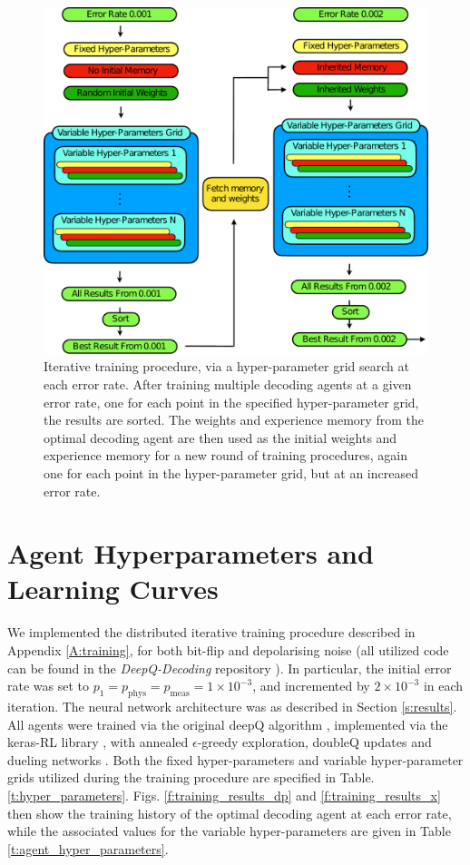 \documentclass[twocolumn,preprintnumbers,amsmath,amssymb,notitlepage,nofootinbib,longbibliography,superscriptaddress,aps,pra,10pt]{revtex4-1}
\begin{document}
	\begin{figure}
		\centering
		\includegraphics[width=\linewidth]{figures/iterative_training.pdf}
		\caption{Iterative training procedure, via a hyper-parameter grid search at each error rate. After training multiple decoding agents at a given error rate, one for each point in the specified hyper-parameter grid, the results are sorted. The weights and experience memory from the optimal decoding agent are then used as the initial weights and experience memory for a new round of training procedures, again one for each point in the hyper-parameter grid, but at an increased error rate.}\label{f:iterative_training}
	\end{figure}

\section{Agent Hyperparameters and Learning Curves}\label{A:parameters}

	We implemented the distributed iterative training procedure described in Appendix \ref{A:training}, for both bit-flip and depolarising noise (all utilized code can be found in the \emph{DeepQ-Decoding} repository \cite{DeepQDecoding}).
	In particular, the initial error rate was set to $p_1 = p_{\mathrm{phys}} = p_{\mathrm{meas}} = 1\times10^{-3}$, and incremented by $2\times10^{-3}$ in each iteration. 
	The neural network architecture was as described in Section \ref{s:results}.
	All agents were trained via the original deepQ algorithm \cite{RLMnih15}, implemented via the keras-RL library \cite{plappert2016kerasrl}, with annealed $\epsilon$-greedy exploration, doubleQ updates \cite{RLvan2016deep} and dueling networks \cite{RLvan2016deep}.
	Both the fixed hyper-parameters and variable hyper-parameter grids utilized during the training procedure are specified in Table. \ref{t:hyper_parameters}.
	Figs. \ref{f:training_results_dp} and \ref{f:training_results_x} then show the training history of the optimal decoding agent at each error rate, while the associated values for the variable hyper-parameters are given in Table \ref{t:agent_hyper_parameters}.
\end{document}
